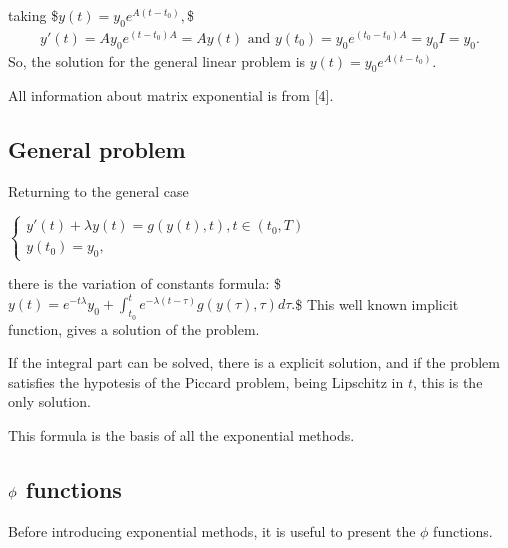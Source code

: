 \documentclass[letterpaper,10pt,english]{jupyterBook}
\begin{document}
\sphinxAtStartPar
taking
\$\(
    y(t) = y_0e^{A(t-t_0)},
\)\$
\begin{equation*}
\begin{split}
    y'(t) = A y_0 e^{(t-t_0)A} = A y(t) \text{ and } y(t_0) = y_0 e^{(t_0-t_0)A} = y_0 I = y_0.
\end{split}
\end{equation*}
\sphinxAtStartPar
So, the solution for the general linear problem is \(y(t)=y_0 e^{A(t-t_0)}\).

\sphinxAtStartPar
All information about matrix exponential is from {[}4{]}.


\subsection{General problem}
\label{\detokenize{cap3:general-problem}}
\sphinxAtStartPar
Returning to the general case

\sphinxAtStartPar
\(\begin{cases}
    y'(t) + \lambda y(t) = g(y(t), t), t \in (t_0, T) \\
    y(t_0) = y_0 
    \text{,}
\end{cases}\)

\sphinxAtStartPar
there is the variation of constants formula:
\$\(
    y(t) = e^{-t \lambda}y_0 + \int_{t_0}^t e^{-\lambda(t-\tau)} g(y(\tau), \tau) d\tau.
\)\$
This well known implicit function, gives a solution of the problem.

\sphinxAtStartPar
If the integral part can be solved, there is a explicit solution, and if the problem satisfies the hypotesis of the Piccard problem, being Lipschitz in \(t\), this is the only solution.

\sphinxAtStartPar
This formula is the basis of all the exponential methods.


\subsection{\protect\(\phi\protect\) functions}
\label{\detokenize{cap3:phi-functions}}
\sphinxAtStartPar
Before introducing exponential methods, it is useful to present the \(\phi\) functions.
\end{document}
